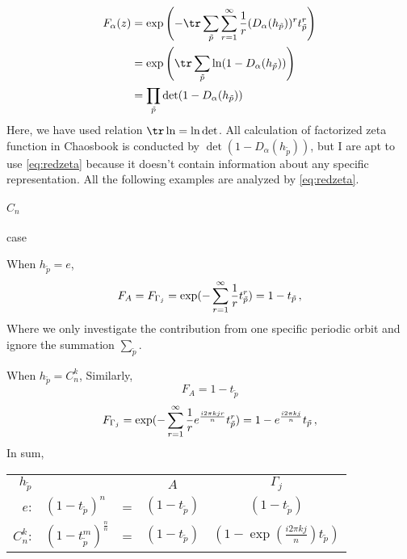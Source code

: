 \begin{align*}
  F_\alpha (z) & =
                 {\rm exp}  \left( -
                 \tr \sum_{\tilde{p}} \sum_{r=1}^\infty \frac{1}{r}
                 (D_{\alpha}(h_{\tilde{p}}))^r t_{\tilde{p}}^r \right) \\
               & ={\rm exp}  \left(
                 \tr \sum_{\tilde{p}} \ln (1-D_{\alpha}(h_{\tilde{p}}))
                 \right) \\
               & = \prod_{\tilde{p}} \det(1-D_{\alpha}(h_{\tilde{p}}))
\end{align*}
Here, we have used relation $\tr \ln= \ln \det$. All calculation of
factorized zeta function in Chaosbook is conducted by
$\det(1-D_{\alpha}(h_{\tilde{p}}))$, but I are apt to use \eqref{eq:redzeta}
because it doesn't contain information about any specific representation.
All the following examples are analyzed by \eqref{eq:redzeta}.

\paragraph{$C_{n}$} case

When $h_{\tilde p}=e$,
\[
  F_{A}=F_{\Gamma_j}={\rm exp} (-\sum_{r=1}^\infty \frac{1}{r}t_{\tilde{p}}^r )
  =1-t_{\tilde p}
  \,,
\]
Where we only investigate the contribution from one specific periodic
orbit and ignore the summation $ \sum_{\tilde{p}}$.

When $h_{\tilde p}=C_n^k$, Similarly,
\[
  F_{A}=1-t_{\tilde p}
\]
\[
  F_{\Gamma_j}={\rm exp} (-\sum_{r=1}^\infty \frac{1}{r}e^{\frac{i2\pi kjr}{n}}
  t_{\tilde{p}}^r )
  =1-e^{\frac{i2\pi kj}{n}} t_{\tilde p}
  \,,
\]
In sum,
\vskip 12pt
\begin{tabular}{rlccc}

  $h_{\tilde p}$ &  & &  $A$  &  $\Gamma_{j}$ \\
  $e$:
                 & $(1-t_{\tilde p} )^n$  &=&$(1-t_{\tilde p})$ & $(1-t_{\tilde p})$  \\
  $C_n^{k}$:
                 & $(1-t_{\tilde p}^m )^{\frac{n}{n}}$ &=&  $(1-t_{\tilde p})$ & $(1-\exp(\frac{i2\pi kj}{n})t_{\tilde p})$ \\
\end{tabular}
\vskip 12pt
\noindent


